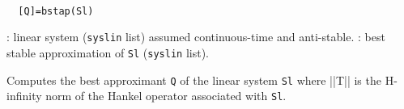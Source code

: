\begin{mandesc}
   \\ %
\end{mandesc}
\begin{calling_sequence}
\begin{verbatim}
  [Q]=bstap(Sl)  
\end{verbatim}
\end{calling_sequence}
\begin{parameters}
  \begin{varlist}
    : linear system (\verb!syslin! list) assumed continuous-time and anti-stable.
    : best stable approximation of \verb!Sl! (\verb!syslin! list).
  \end{varlist}
\end{parameters}
\begin{mandescription}
  Computes the best approximant \verb!Q! of the linear system \verb!Sl! where
  ||T|| is the  H-infinity norm of the Hankel operator associated with \verb!Sl!.
\end{mandescription}
\begin{manseealso}
\end{manseealso}
